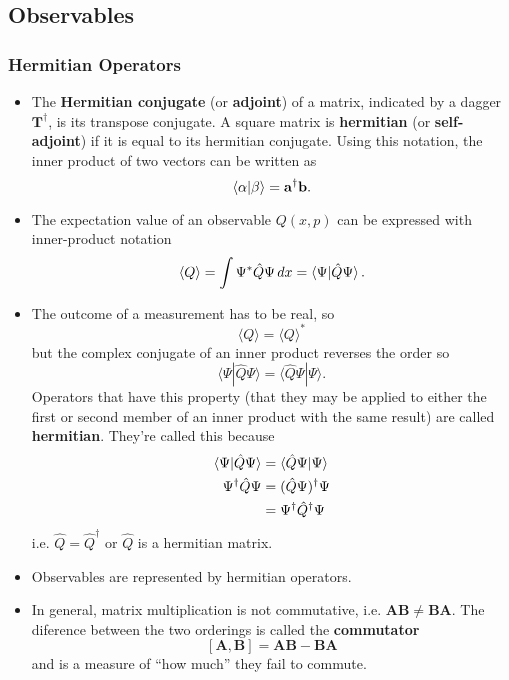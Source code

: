 \documentclass{article}
\newcommand{\ev}[1]{\langle #1 \rangle}
\renewcommand{\vec}[1]{\boldsymbol{\mathbf{#1}}}
\begin{document}
\subsection{Observables}

\subsubsection{Hermitian Operators}

\begin{itemize}
  \item The \textbf{Hermitian conjugate} (or \textbf{adjoint}) of a matrix, indicated by a dagger $\vec{T}^\dagger$, is its transpose conjugate. A square matrix is \textbf{hermitian} (or \textbf{self-adjoint}) if it is equal to its hermitian conjugate. Using this notation, the inner product of two vectors can be written as \[\braket{\alpha | \beta} = \vec{a}^\dagger \vec{b}.\]

  \item The expectation value of an observable $Q(x, p)$ can be expressed with inner-product notation \[\ev{Q} = \int \Psi^* \hat{Q} \Psi \,d x = \braket{\Psi | \hat{Q} \Psi}.\]

  \item The outcome of a measurement has to be real, so \[\ev{Q} = \ev{Q}^*\] but the complex conjugate of an inner product reverses the order so \[\ev{\Psi | \hat{Q} \Psi} = \ev{\hat{Q} \Psi | \Psi}.\] Operators that have this property (that they may be applied to either the first or second member of an inner product with the same result) are called \textbf{hermitian}. They're called this because \begin{align*}
          \braket{\Psi | \hat{Q} \Psi} & = \braket{\hat{Q} \Psi | \Psi}      \\
          \Psi^\dagger \hat{Q} \Psi    & = (\hat{Q} \Psi)^\dagger \Psi       \\
                                       & = \Psi^\dagger \hat{Q}^\dagger \Psi
        \end{align*} i.e. $\hat{Q} = \hat{Q}^\dagger$ or $\hat{Q}$ is a hermitian matrix.

  \item Observables are represented by hermitian operators.

  \item In general, matrix multiplication is not commutative, i.e. $\vec{A} \vec{B} \ne \vec{B} \vec{A}$. The diference between the two orderings is called the \textbf{commutator} \[[\vec{A}, \vec{B}] = \vec{A} \vec{B} - \vec{B} \vec{A}\] and is a measure of ``how much'' they fail to commute.
\end{itemize}
\end{document}
